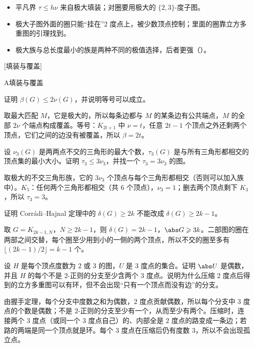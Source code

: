
\begin{itemize}
\item 平凡界 $\tau\leqslant h\nu$ 来自极大填装；对圈要用极大的 $\{2,3\}$-度子图。
\item 极大子图外面的圈只能“挂在”$2$ 度点上，被少数顶点控制；里面的圈靠立方多重图的引理找到。
\item 极大族与总长度最小的族是两种不同的极值选择，后者更强（）。
\end{itemize}

[填装与覆盖]


\begin{exercises}{A}{填装与覆盖}
\item\label{ex:packing:A1} 证明 $\beta(G)\leqslant2\nu(G)$，并说明等号可以成立。
\begin{solution}
取最大匹配 $M$，它是极大的，所以每条边都与 $M$ 的某条边有公共端点，$M$ 的全部 $2\nu$ 个端点构成覆盖。等号：$K_{2t+1}$ 中 $\nu=t$，任意 $2t-1$ 个顶点之外还剩两个顶点，它们之间的边没有被覆盖，所以 $\beta=2t$。
\end{solution}

\item\label{ex:packing:A2} 设 $\nu_3(G)$ 是两两点不交的三角形的最大个数，$\tau_3(G)$ 是与所有三角形都相交的顶点集的最小大小。证明 $\tau_3\leqslant3\nu_3$，并找一个 $\tau_3=3\nu_3$ 的图。
\begin{solution}
取极大的不交三角形族，它的 $3\nu_3$ 个顶点与每个三角形都相交（否则可以加入族中）。$K_5$：任何两个三角形都相交（共 $6$ 个顶点），$\nu_3=1$；删去两个顶点剩下 $K_3$，所以 $\tau_3=3$。
\end{solution}

\item\label{ex:packing:A3} 证明 Corrádi--Hajnal 定理中的 $\delta(G)\geqslant2k$ 不能改成 $\delta(G)\geqslant2k-1$。
\begin{solution}
取 $G=K_{2k-1,N}$，$N\geqslant2k-1$，则 $\delta(G)=2k-1$，$\abs G\geqslant3k$。二部图的圈在两部之间交替，每个圈至少用到小的一侧的两个顶点，所以不交的圈至多有 $\lfloor(2k-1)/2\rfloor=k-1$ 个。
\end{solution}

\item\label{ex:packing:A4} 设 $H$ 是每个顶点度数为 $2$ 或 $3$ 的图，$U$ 是 $3$ 度点的集合。证明 $\abs U$ 是偶数，并且 $H$ 的每个不是 $2$-正则的分支至少含两个 $3$ 度点。说明为什么压缩 $2$ 度点后得到的立方多重图可以有环，但不会出现“只有一个顶点而没有边”的分支。
\begin{solution}
由握手定理，每个分支中度数之和为偶数，$2$ 度点贡献偶数，所以每个分支中 $3$ 度点的个数是偶数；不是 $2$-正则的分支至少有一个，从而至少有两个。压缩时，连接两个 $3$ 度点（或同一个 $3$ 度点自己）的、内部全是 $2$ 度点的路变成一条边；若路的两端是同一个顶点就是环。每个 $3$ 度点在压缩后仍有度数 $3$，所以不会出现孤立点。
\end{solution}
\end{exercises}
